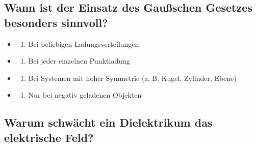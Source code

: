 \documentclass[
  11pt,
]{article}
\providecommand{\tightlist}{%
  \setlength{\itemsep}{0pt}\setlength{\parskip}{0pt}}
\begin{document}
\subsection{Wann ist der Einsatz des Gaußschen Gesetzes besonders
sinnvoll?}\label{wann-ist-der-einsatz-des-gauuxdfschen-gesetzes-besonders-sinnvoll}

\begin{itemize}
\tightlist
\item
  \begin{enumerate}
  \def\labelenumi{\Alph{enumi})}
  \tightlist
  \item
    Bei beliebigen Ladungsverteilungen\\
  \end{enumerate}
\item
  \begin{enumerate}
  \def\labelenumi{\Alph{enumi})}
  \setcounter{enumi}{1}
  \tightlist
  \item
    Bei jeder einzelnen Punktladung\\
  \end{enumerate}
\item
  \begin{enumerate}
  \def\labelenumi{\Alph{enumi})}
  \setcounter{enumi}{2}
  \tightlist
  \item
    Bei Systemen mit hoher Symmetrie (z. B. Kugel, Zylinder, Ebene)\\
  \end{enumerate}
\item
  \begin{enumerate}
  \def\labelenumi{\Alph{enumi})}
  \setcounter{enumi}{3}
  \tightlist
  \item
    Nur bei negativ geladenen Objekten
  \end{enumerate}
\end{itemize}

\subsection{Warum schwächt ein Dielektrikum das elektrische
Feld?}\label{warum-schwuxe4cht-ein-dielektrikum-das-elektrische-feld}
\end{document}
